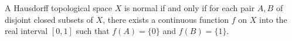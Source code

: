 A Hausdorff topological space $X$ is normal if and only if for each pair $A, B$ of disjoint closed subsets of $X$, there exists a continuous function $f$ on $X$ into the real interval $[0, 1]$ such that $f(A) = \{0\}$ and $f(B) = \{1\}$.
